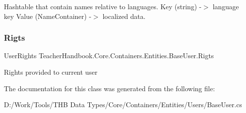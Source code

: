 Hashtable that contain names relative to languages. Key (string) -\/$>$ language key Value (Name\+Container) -\/$>$ localized data. 

\mbox{\label{class_teacher_handbook_1_1_core_1_1_containers_1_1_entities_1_1_base_user_a0aeebd3854d7996435cdb2fc691c2bc3}} 
\subsubsection{\texorpdfstring{Rigts}{Rigts}}
{\footnotesize\ttfamily User\+Rights Teacher\+Handbook.\+Core.\+Containers.\+Entities.\+Base\+User.\+Rigts\hspace{0.3cm}{\ttfamily [get]}}



Rights provided to current user 



The documentation for this class was generated from the following file\+:\begin{DoxyCompactItemize}
\item 
D\+:/\+Work/\+Tools/\+T\+H\+B Data Types/\+Core/\+Containers/\+Entities/\+Users/Base\+User.\+cs\end{DoxyCompactItemize}
